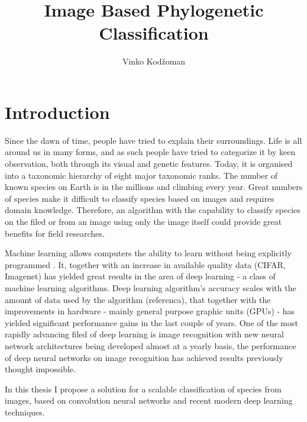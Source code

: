\documentclass[times, utf8, diplomski]{fer}
\begin{document}
\title{Image Based Phylogenetic Classification}
\author{Vinko Kodžoman}

\maketitle

\izvornik


\tableofcontents

\chapter{Introduction}
Since the dawn of time, people have tried to explain their surroundings. Life is all around us in many forms, and as such people have tried to categorize it by keen observation, both through its visual and genetic features. Today, it is organised into a taxonomic hierarchy of eight major taxonomic ranks. The number of known species on Earth is in the millions and climbing every year. Great numbers of species make it difficult to classify species based on images and requires domain knowledge. Therefore, an algorithm with the capability to classify species on the filed or from an image using only the image itself could provide great benefits for field researches.

Machine learning allows computers the ability to learn without being explicitly programmed \citep{samuel_studies_1959}. It, together with an increase in available quality data (CIFAR, Imagenet) has yielded great results in the area of deep learning - a class of machine learning algorithms. Deep learning algorithm's accuracy scales with the amount of data used by the algorithm (referenca), that together with the improvements in hardware - mainly general purpose graphic units (GPUs) - has yielded significant performance gains in the last couple of years. One of the most rapidly advancing filed of deep learning is image recognition \citep{krizhevsky_imagenet_2012, simonyan_very_2014, szegedy_going_2015, he_deep_2016} with new neural network architectures being developed almost at a yearly basis, the performance of deep neural networks on image recognition has achieved results previously thought impossible.

In this thesis I propose a solution for a scalable classification of species from images, based on convolution neural networks and recent modern deep learning techniques.
\end{document}
